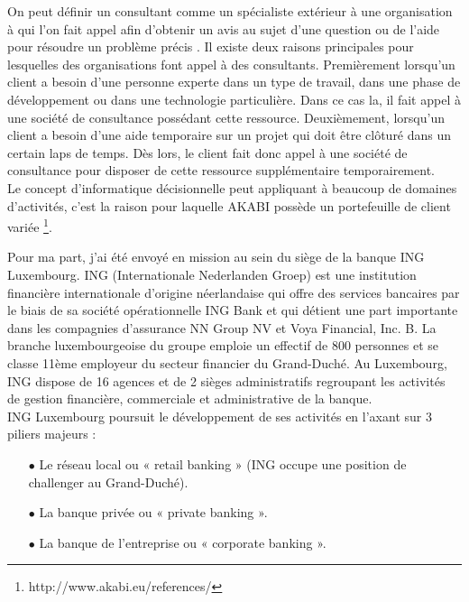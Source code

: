 \documentclass[a4paper, 12pt, french]{article}
\begin{document}
On peut définir un consultant comme un spécialiste extérieur à une organisation à qui l’on fait appel afin d’obtenir un avis au sujet d’une question ou de l’aide pour résoudre un problème précis \citep{GDTConsultant}. Il existe deux raisons principales pour lesquelles des organisations font appel à des consultants. Premièrement lorsqu'un client a besoin d’une personne experte dans un type de travail, dans une phase de développement ou dans une technologie particulière. Dans ce cas la, il fait appel à une société de consultance possédant cette ressource. Deuxièmement, lorsqu'un client a besoin d’une aide temporaire sur un projet qui doit être clôturé dans un certain laps de temps. Dès lors, le client fait donc appel à une société de consultance pour disposer de cette ressource supplémentaire temporairement. \\

Le concept d’informatique décisionnelle peut appliquant à beaucoup de domaines d’activités, c’est la raison pour laquelle AKABI possède un portefeuille de client variée \footnote{http://www.akabi.eu/references/}. 

Pour ma part, j’ai été envoyé en mission au sein du siège de la banque ING Luxembourg. ING (Internationale Nederlanden Groep) est une institution financière internationale d'origine néerlandaise qui offre des services bancaires par le biais de sa société opérationnelle ING Bank et qui détient une part importante dans les compagnies d'assurance NN Group NV et Voya Financial, Inc. B. La branche luxembourgeoise du groupe emploie un effectif de 800 personnes et se classe 11ème employeur du secteur financier du Grand-Duché. Au Luxembourg, ING dispose de 16 agences et de 2 sièges administratifs regroupant les activités de gestion financière, commerciale et administrative de la banque. \\

ING Luxembourg poursuit le développement de ses activités en l’axant sur 3 piliers majeurs : 
\vspace{0.25cm}
\begin{itemize}
\item[$\bullet$] Le réseau local ou « retail banking » (ING occupe une position de challenger au Grand-Duché).
\item[$\bullet$] La banque privée ou « private banking ».
\item[$\bullet$] La banque de l’entreprise ou « corporate banking ».
\end{itemize}
\vspace{0.5cm}
\end{document}
